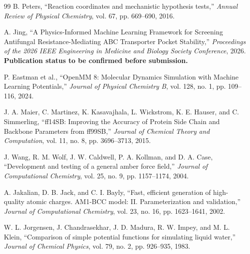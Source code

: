 \documentclass[11pt]{article}
\begin{document}
\begin{thebibliography}{99}
B. Peters,
``Reaction coordinates and mechanistic hypothesis tests,''
\emph{Annual Review of Physical Chemistry}, vol. 67, pp. 669--690, 2016.

A. Jing,
``A Physics-Informed Machine Learning Framework for Screening Antifungal Resistance-Mediating ABC Transporter Pocket Stability,''
\emph{Proceedings of the 2026 IEEE Engineering in Medicine and Biology Society Conference}, 2026.
\textbf{Publication status to be confirmed before submission.}

P. Eastman et al.,
``OpenMM 8: Molecular Dynamics Simulation with Machine Learning Potentials,''
\emph{Journal of Physical Chemistry B}, vol. 128, no. 1, pp. 109--116, 2024.

J. A. Maier, C. Martinez, K. Kasavajhala, L. Wickstrom, K. E. Hauser, and C. Simmerling,
``ff14SB: Improving the Accuracy of Protein Side Chain and Backbone Parameters from ff99SB,''
\emph{Journal of Chemical Theory and Computation}, vol. 11, no. 8, pp. 3696--3713, 2015.

J. Wang, R. M. Wolf, J. W. Caldwell, P. A. Kollman, and D. A. Case,
``Development and testing of a general amber force field,''
\emph{Journal of Computational Chemistry}, vol. 25, no. 9, pp. 1157--1174, 2004.

A. Jakalian, D. B. Jack, and C. I. Bayly,
``Fast, efficient generation of high-quality atomic charges. AM1-BCC model: II. Parameterization and validation,''
\emph{Journal of Computational Chemistry}, vol. 23, no. 16, pp. 1623--1641, 2002.

W. L. Jorgensen, J. Chandrasekhar, J. D. Madura, R. W. Impey, and M. L. Klein,
``Comparison of simple potential functions for simulating liquid water,''
\emph{Journal of Chemical Physics}, vol. 79, no. 2, pp. 926--935, 1983.

\end{thebibliography}
\end{document}
